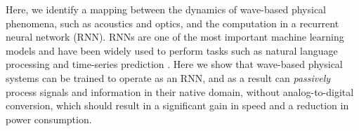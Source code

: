 Here, we identify a mapping between the dynamics of wave-based physical phenomena, such as acoustics and optics, and the computation in a recurrent neural network (RNN).
RNNs are one of the most important machine learning models and have been widely used to perform tasks such as natural language processing \cite{yao2013recurrent} and time-series prediction \cite{husken_recurrent_2003, dorffner_neural_1996, connor_recurrent_1994}.
Here we show that wave-based physical systems can be trained to operate as an RNN, and as a result can \textit{passively} process signals and information in their native domain, without analog-to-digital conversion, which should result in a significant gain in speed and a reduction in power consumption.


